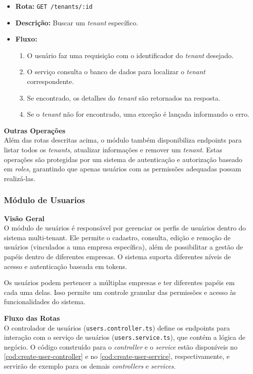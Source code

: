 \begin{itemize}
	\item \textbf{Rota:} \texttt{GET /tenants/:id}
	\item \textbf{Descrição:} Buscar um \textit{tenant} específico.
	\item \textbf{Fluxo:}
	\begin{enumerate}
    \item O usuário faz uma requisição com o identificador do \textit{tenant} desejado.
    \item O serviço consulta o banco de dados para localizar o \textit{tenant} correspondente.
    \item Se encontrado, os detalhes do \textit{tenant} são retornados na resposta.
    \item Se o \textit{tenant} não for encontrado, uma exceção é lançada informando o erro.
	\end{enumerate}
\end{itemize}

\noindent\textbf{Outras Operações} \\
Além das rotas descritas acima, o módulo também disponibiliza endpoints para listar todos os \textit{tenants}, atualizar informações e remover um \textit{tenant}. Estas operações são protegidas por um sistema de autenticação e autorização baseado em \textit{roles}, garantindo que apenas usuários com as permissões adequadas possam realizá-las.

\subsubsection{Módulo de Usuarios}\label{subsubsec:modulo_usuarios}

\noindent\textbf{Visão Geral}\\
O módulo de usuários é responsável por gerenciar os perfis de usuários dentro do sistema multi-tenant. Ele permite o cadastro, consulta, edição e remoção de usuários (vinculados a uma empresa específica), além de possibilitar a gestão de papéis dentro de diferentes empresas. O sistema suporta diferentes níveis de acesso e autenticação baseada em tokens.

Os usuários podem pertencer a múltiplas empresas e ter diferentes papéis em cada uma delas. Isso permite um controle granular das permissões e acesso às funcionalidades do sistema.

\noindent\textbf{Fluxo das Rotas}\\
O controlador de usuários (\texttt{users.controller.ts}) define os endpoints para interação com o serviço de usuários (\texttt{users.service.ts}), que contém a lógica de negócio. O código construído para o \textit{controller} e  o \textit{service} estão disponíveis no \autoref{cod:create-user-controller} e  no \autoref{cod:create-user-service}, respectivamente, e servirão de exemplo para os demais \textit{controllers} e \textit{services}.

